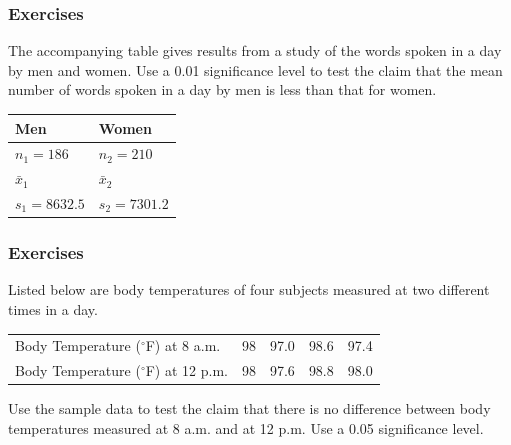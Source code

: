 \documentclass[xcolor=dvipsnames]{beamer}
\begin{document}


\begin{frame}
  \frametitle{Exercises}
{\ubung} The accompanying table
gives results from a study of the words spoken in a day by men and
women. Use a 0.01 significance level to test the claim that the
mean number of words spoken in a day by men is less than that for
women.

\bigskip

\begin{tabular}{|l|l|} \hline
\textbf{Men}  & \textbf{Women} \\ \hline
$n_{1}=186$   & $n_{2}=210$    \\ \hline
$\bar{x}_{1}$ & $\bar{x}_{2}$  \\ \hline
$s_{1}=8632.5$ & $s_{2}=7301.2$ \\ \hline
\end{tabular}
\end{frame}

\begin{frame}
  \frametitle{Exercises}
{\ubung} Listed below are body temperatures of four
subjects measured at two different times in a day.

\bigskip

\begin{tabular}{lrrrr}
  Body Temperature ($^{\circ}$F) at 8 a.m. & 98 & 97.0 & 98.6 & 97.4 \\
  Body Temperature ($^{\circ}$F) at 12 p.m. & 98 & 97.6 & 98.8 & 98.0
\end{tabular}

\bigskip

Use the sample data to test the claim that there is no difference
between body temperatures measured at 8 a.m. and at 12 p.m. Use a 0.05
significance level.
\end{frame}
\end{document}
